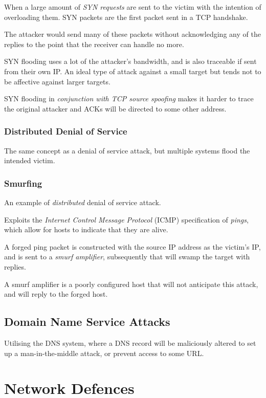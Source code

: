 \documentclass{article}
\begin{document}
When a large amount of \textit{SYN requests} are sent to the victim with the intention of overloading them. SYN packets are the first packet sent in a TCP handshake.

The attacker would send many of these packets without acknowledging any of the replies to the point that the receiver can handle no more. 

SYN flooding uses a lot of the attacker's bandwidth, and is also traceable if sent from their own IP. An ideal type of attack against a small target but tends not to be affective against larger targets.

SYN flooding in \textit{conjunction with TCP source spoofing} makes it harder to trace the original attacker and ACKs will be directed to some other address.

\subsubsection{Distributed Denial of Service}

The same concept as a denial of service attack, but multiple systems flood the intended victim.

\subsubsection{Smurfing}

An example of \textit{distributed} denial of service attack.

Exploits the \textit{Internet Control Message Protocol} (ICMP) specification of \textit{pings}, which allow for hosts to indicate that they are alive.

A forged ping packet is constructed with the source IP address as the victim's IP, and is sent to a \textit{smurf amplifier}, subsequently that will swamp the target with replies.

A smurf amplifier is a poorly configured host that will not anticipate this attack, and will reply to the forged host.

\subsection{Domain Name Service Attacks}

Utilising the DNS system, where a DNS record will be maliciously altered to set up a man-in-the-middle attack, or prevent access to some URL.

\filbreak
\section{Network Defences}
\end{document}

